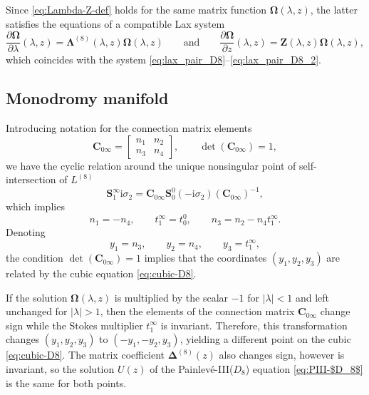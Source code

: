 \documentclass[pdftex]{sigma}
\numberwithin{equation}{section}
\newcommand{\ii}{\mathrm{i}}
\begin{document}
Since \eqref{eq:Lambda-Z-def} holds for the same matrix function $\mathbf{\Omega}(\lambda,z)$, the latter satisfies the equations of a compatible Lax system
\begin{equation}
 \frac{\partial\mathbf{\Omega}}{\partial\lambda}(\lambda,z)=\mathbf{\Lambda}^{(8)}(\lambda,z)\mathbf{\Omega}(\lambda,z)\qquad\text{and}\qquad\frac{\partial\mathbf{\Omega}}{\partial z}(\lambda,z)=\mathbf{Z}(\lambda,z)\mathbf{\Omega}(\lambda,z),
\label{eq:Lax-system}
\end{equation}
which coincides with the system \eqref{eq:lax_pair_D8}--\eqref{eq:lax_pair_D8_2}.

\subsection{Monodromy manifold}
\label{sec:monodromy-rep-$D_8$-manifold}
Introducing notation for the connection matrix elements
\begin{equation*}
 \mathbf{C}_{0\infty}=\begin{bmatrix}
 n_1&n_2\\n_3&n_4
 \end{bmatrix},\qquad \det(\mathbf{C}_{0\infty})=1,
\end{equation*}
we have the cyclic relation around the unique nonsingular point of self-intersection of $L^{(8)}$
 \begin{equation*}%
\mathbf{S}^\infty_{{1}}\ii\sigma_2= \mathbf{C}_{0\infty}\mathbf{S}^0_{{0}}(-\ii\sigma_2)(\mathbf{C}_{0\infty})^{-1},
\end{equation*}
which implies
\[
n_1=-n_4,\qquad t_1^{\infty}=t_{0}^0,\qquad n_3=n_2-n_4t_1^{\infty}.
\]
Denoting
\[
y_1=n_3,\qquad y_2=n_4,\qquad y_3=t_1^{\infty},
\]
the condition $\det(\mathbf{C}_{0\infty})=1$ implies that the coordinates $(y_1,y_2,y_3)$ are related by the cubic equation \eqref{eq:cubic-D8}.

\begin{Remark}
 If the solution $\mathbf{\Omega}(\lambda,z)$ is multiplied by the scalar $-1$ for $|\lambda|<1$ and left unchanged for $|\lambda|>1$, then the elements of the connection matrix $\mathbf{C}_{0\infty}$ change sign while the Stokes multiplier $t_1^\infty$ is invariant. Therefore, this transformation changes $(y_1,y_2,y_3)$ to $(-y_1,-y_2,y_3)$, yielding a different point on the cubic \eqref{eq:cubic-D8}. The matrix coefficient $\mathbf{\Delta}^{(8)}(z)$ also changes sign, however  is invariant, so the solution $U(z)$ of the Painlev\'e-III($D_8$) equation \eqref{eq:PIII-$D_8$} is the same for both points.
 \label{rem:minus-y1-y2}
\end{Remark}
\end{document}
